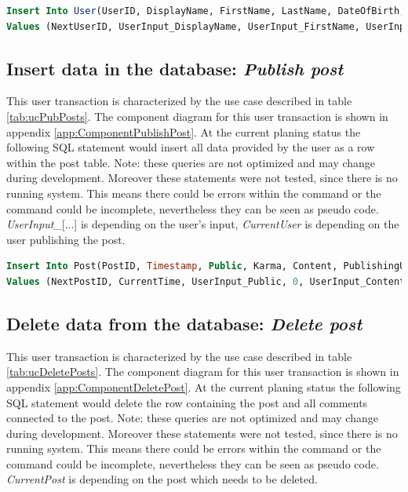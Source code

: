 \documentclass[11pt,a4paper]{report}
\begin{document}
\begin{lstlisting}[frame=single, language=SQL, caption=\emph{Create user} SQL statement, keepspaces=true, breaklines=true]
Insert Into User(UserID, DisplayName, FirstName, LastName, DateOfBirth, RelationshipStatus, Gender, EMail, Street, HouseNr, Town, Zip, Picture, Premium, Password)
Values (NextUserID, UserInput_DisplayName, UserInput_FirstName, UserInput_LastName, UserInput_DateOfBirth, UserInput_RelationshipStatus, UserInput_Gender, UserInput_EMail, UserInput_Street, UserInput_HouseNr, UserInput_Town, UserInput_Zip, null, false, UserInput_Password);
\end{lstlisting}

\subsection{Insert data in the database: \emph{Publish post}}
This user transaction is characterized by the use case described in table \vref{tab:ucPubPosts}. The component diagram for this user transaction is shown in appendix \vref{app:ComponentPublishPost}. At the current planing status the following SQL statement would insert all data provided by the user as a row within the post table. Note: these queries are not optimized and may change during development. Moreover these statements were not tested, since there is no running system. This means there could be errors within the command or the command could be incomplete, nevertheless they can be seen as pseudo code. \emph{UserInput\_}[...] is depending on the user's input, \emph{CurrentUser} is depending on the user publishing the post.

\begin{lstlisting}[frame=single, language=SQL, caption=\emph{Publish Post} SQL statement, keepspaces=true, breaklines=true]
Insert Into Post(PostID, Timestamp, Public, Karma, Content, PublishingUse, PublishingPage)
Values (NextPostID, CurrentTime, UserInput_Public, 0, UserInput_Content, CurrentUser, null);
\end{lstlisting}

\subsection{Delete data from the database: \emph{Delete post}}
This user transaction is characterized by the use case described in table \vref{tab:ucDeletePosts}. The component diagram for this user transaction is shown in appendix \vref{app:ComponentDeletePost}. At the current planing status the following SQL statement would delete the row containing the post and all comments connected to the post. Note: these queries are not optimized and may change during development. Moreover these statements were not tested, since there is no running system. This means there could be errors within the command or the command could be incomplete, nevertheless they can be seen as pseudo code. \emph{CurrentPost} is depending on the post which needs to be deleted.
\end{document}
